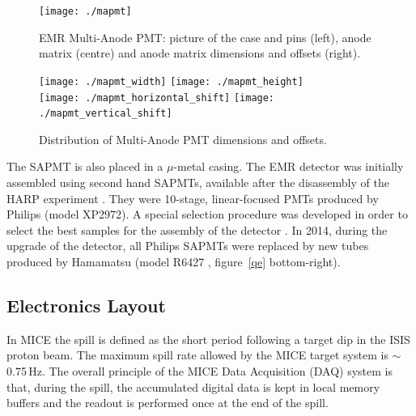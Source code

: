 \documentclass[a4paper,11pt]{article}
\begin{document}
\begin{figure}[h]
 \centering
 \texttt{[image: ./mapmt]}
 \caption[Multi-Anode PMT]{EMR Multi-Anode PMT: picture of the case and pins (left), anode matrix (centre) and anode matrix dimensions and offsets (right).}
 \label{fig:mapmt}
\end{figure}

\begin{figure}[h]
 \centering
 \texttt{[image: ./mapmt\_width]}
 \texttt{[image: ./mapmt\_height]}\\
 \texttt{[image: ./mapmt\_horizontal\_shift]}
 \texttt{[image: ./mapmt\_vertical\_shift]}
 \caption[Distribution of Multi-Anode PMT dimensions]{Distribution of Multi-Anode PMT dimensions and offsets.}
 \label{fig:mapmt_dimensions}
\end{figure}

The SAPMT is also placed in a $\mu$-metal casing. The EMR detector was initially assembled
using second hand SAPMTs, available after the disassembly of the HARP experiment \cite{harp}. They were 10-stage, linear-focused PMTs produced
by Philips (model XP2972). A special selection procedure was developed in order to select the best samples for the assembly of the detector
\cite{philips}. In 2014, during the upgrade of the detector, all Philips SAPMTs were replaced by new tubes produced by Hamamatsu (model R6427
\cite{hamamatsu_mapmt}, figure~\ref{qe} bottom-right).

\subsection{Electronics Layout}
In MICE the spill is defined as the short period following a target dip in the ISIS proton beam. The maximum spill rate allowed by the
MICE target system is $\sim\,$0.75\,Hz. The overall principle of the MICE Data Acquisition (DAQ) system is that, during the spill, the
accumulated digital data is kept in local memory buffers and the readout is performed once at the end of the spill.
\end{document}
